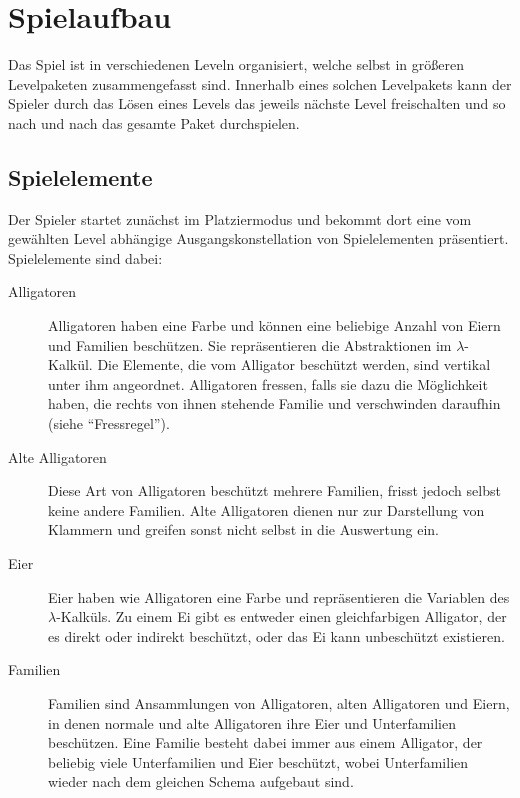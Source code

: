\section{Spielaufbau}

Das Spiel ist in verschiedenen Leveln organisiert, welche selbst in größeren Levelpaketen zusammengefasst sind.
Innerhalb eines solchen Levelpakets kann der Spieler durch das Lösen eines Levels das jeweils nächste Level freischalten und so nach und nach das gesamte Paket durchspielen.

\subsection{Spielelemente}
Der Spieler startet zunächst im Platziermodus und bekommt dort eine vom gewählten Level abhängige Ausgangskonstellation von Spielelementen präsentiert. 
Spielelemente sind dabei:

        \begin{description}
                \item[Alligatoren] Alligatoren haben eine Farbe und können eine beliebige Anzahl von Eiern und Familien beschützen.
                Sie repräsentieren die Abstraktionen im \(\lambda\)-Kalkül.
                Die Elemente, die vom Alligator beschützt werden, sind vertikal unter ihm angeordnet.
                Alligatoren fressen, falls sie dazu die Möglichkeit haben, die rechts von ihnen stehende Familie und verschwinden daraufhin (siehe "`Fressregel"').

                \item[Alte Alligatoren] Diese Art von Alligatoren beschützt mehrere Familien, frisst jedoch selbst keine andere Familien.
                Alte Alligatoren dienen nur zur Darstellung von Klammern und greifen sonst nicht selbst in die Auswertung ein.

                \item[Eier] Eier haben wie Alligatoren eine Farbe und repräsentieren die Variablen des \(\lambda\)-Kalküls.
                Zu einem Ei gibt es entweder einen gleichfarbigen Alligator, der es direkt oder indirekt beschützt, oder das Ei kann unbeschützt existieren.

                \item[Familien] Familien sind Ansammlungen von Alligatoren, alten Alligatoren und Eiern, in denen normale und alte Alligatoren ihre Eier und Unterfamilien beschützen.
                Eine Familie besteht dabei immer aus einem Alligator, der beliebig viele Unterfamilien und Eier beschützt, wobei Unterfamilien wieder nach dem gleichen Schema aufgebaut sind.

        \end{description}



